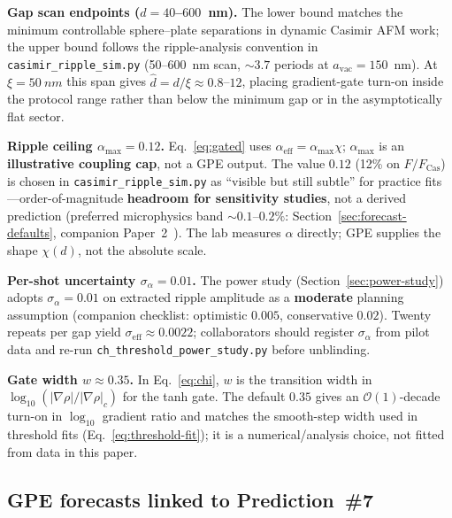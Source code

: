 \documentclass[11pt,a4paper]{article}
\begin{document}
\textbf{Gap scan endpoints ($d = 40$--$600$~nm).}
The lower bound matches the minimum controllable sphere--plate separations in dynamic Casimir AFM work; the upper bound follows the ripple-analysis convention in \texttt{casimir\_ripple\_sim.py} (50--600~nm scan, $\sim 3.7$ periods at $a_{\mathrm{vac}} = 150$~nm).
At $\xi = \SI{50}{nm}$ this span gives $\hat{d} = d/\xi \approx 0.8$--$12$, placing gradient-gate turn-on inside the protocol range rather than below the minimum gap or in the asymptotically flat sector.

\textbf{Ripple ceiling $\alpha_{\max} = 0.12$.}
Eq.~\ref{eq:gated} uses $\alpha_{\mathrm{eff}} = \alpha_{\max}\chi$; $\alpha_{\max}$ is an \textbf{illustrative coupling cap}, not a GPE output.
The value $0.12$ (12\% on $F/F_{\mathrm{Cas}}$) is chosen in \texttt{casimir\_ripple\_sim.py} as ``visible but still subtle'' for practice fits---order-of-magnitude \textbf{headroom for sensitivity studies}, not a derived prediction (preferred microphysics band $\sim 0.1$--$0.2\%$: Section~\ref{sec:forecast-defaults}, companion Paper~2~\cite{CHPaper2}).
The lab measures $\alpha$ directly; GPE supplies the shape $\chi(d)$, not the absolute scale.

\textbf{Per-shot uncertainty $\sigma_\alpha = 0.01$.}
The power study (Section~\ref{sec:power-study}) adopts $\sigma_\alpha = 0.01$ on extracted ripple amplitude as a \textbf{moderate} planning assumption (companion checklist: optimistic $0.005$, conservative $0.02$).
Twenty repeats per gap yield $\sigma_{\mathrm{eff}} \approx 0.0022$; collaborators should register $\sigma_\alpha$ from pilot data and re-run \texttt{ch\_threshold\_power\_study.py} before unblinding.

\textbf{Gate width $w \approx 0.35$.}
In Eq.~\ref{eq:chi}, $w$ is the transition width in $\log_{10}(|\nabla\rho|/|\nabla\rho|_c)$ for the tanh gate.
The default $0.35$ gives an $\mathcal{O}(1)$-decade turn-on in $\log_{10}$ gradient ratio and matches the smooth-step width used in threshold fits (Eq.~\ref{eq:threshold-fit}); it is a numerical/analysis choice, not fitted from data in this paper.

\subsection{GPE forecasts linked to Prediction~\#7}
\label{sec:gpe-p7-forecasts}
\end{document}
